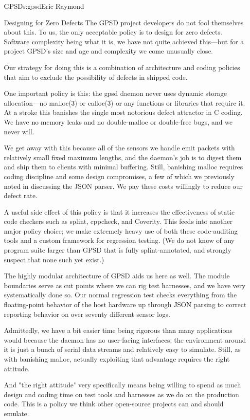 \begin{aosachapter}{GPSD}{s:gpsd}{Eric Raymond}
\begin{aosasect1}{Designing for Zero Defects}
The GPSD project developers do not fool themselves about this.  To us,
the only acceptable policy is to design for zero defects. Software
complexity being what it is, we have not quite achieved this---but for
a project GPSD's size and age and complexity we come unusually close.

Our strategy for doing this is a combination of architecture and
coding policies that aim to exclude the possibility of defects in
shipped code.

One important policy is this: the gpsd daemon never uses dynamic
storage allocation---no malloc(3) or calloc(3) or any functions or
libraries that require it.  At a stroke this banishes the single most
notorious defect attractor in C coding.  We have no memory leaks
and no double-malloc or double-free bugs, and we never will.

We get away with this because all of the sensors we handle emit
packets with relatively small fixed maximum lengths, and the
daemon's job is to digest them and ship them to clients with
minimal buffering.  Still, banishing malloc requires coding
discipline and some design compromises, a few of which we
previously noted in discussing the JSON parser. We pay these
costs willingly to reduce our defect rate.

A useful side effect of this policy is that it increases the
effectiveness of static code checkers such as splint, cppcheck, and
Coverity.  This feeds into another major policy choice; we make
extremely heavy use of both these code-auditing tools and a custom
framework for regression testing.  (We do not know of any program
suite larger than GPSD that is fully splint-annotated, and strongly
suspect that none such yet exist.)

The highly modular architecture of GPSD aids us here as well. The
module boundaries serve as cut points where we can rig test harnesses,
and we have very systematically done so.  Our normal regression test
checks everything from the floating-point behavior of the host
hardware up through JSON parsing to correct reporting behavior on over
seventy different sensor logs.

Admittedly, we have a bit easier time being rigorous than many
applications would because the daemon has no user-facing interfaces;
the environment around it is just a bunch of serial data streams and
relatively easy to simulate.  Still, as with banishing malloc,
actually exploiting that advantage requires the right attitude.

And "the right attitude" very specifically means being willing to
spend as much design and coding time on test tools and harnesses as we
do on the production code.  This is a policy we think other
open-source projects can and should emulate.  


\end{aosasect1}
\end{aosachapter}
